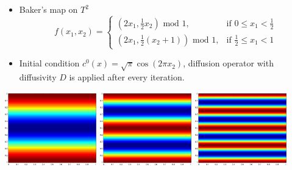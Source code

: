 \documentclass[12pt,t]{beamer}
\begin{document}
\begin{frame}
  \begin{itemize}
  \item Baker's map on $T^2$
    \begin{equation*}
      f(x_1,x_2) = 
      \begin{cases}
        (2x_1,\frac{1}{2}x_2) \text{ mod } 1,
        & \text{if } 0 \le x_1 < \frac{1}{2} \\
        (2x_1,\frac{1}{2}(x_2+1)) \text{ mod } 1,
        & \text{if } \frac{1}{2} \le x_1 < 1
      \end{cases}
    \end{equation*}
  \item Initial condition $c^0(x)= \sqrt{\pi} \cos(2 \pi x_2)$,
    diffusion operator with diffusivity $D$ is applied after every
    iteration.
  \end{itemize}
  \begin{center}
    \includegraphics[width=0.3\textwidth]{baker1}
    \includegraphics[width=0.3\textwidth]{baker2}
    \includegraphics[width=0.3\textwidth]{baker3}
  \end{center}
\end{frame}
\end{document}
